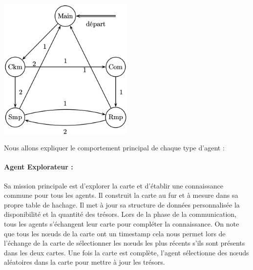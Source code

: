 \documentclass[10pt]{article}
\begin{document}
\begin{center}
	\includegraphics[width=0.5\textwidth]{automate.png}
\end{center}

Nous allons expliquer le comportement principal de chaque type d'agent :
\paragraph{Agent Explorateur :}
Sa mission principale est d'explorer la carte et d'établir une connaissance commune pour tous les agents. Il construit la carte au fur et à mesure dans sa propre table de hachage. Il met à jour sa structure de données personnalisée la disponibilité et la quantité des trésors. Lors de la phase de la communication, tous les agents s'échangent leur carte pour compléter la connaissance. On note que tous les n\oe{}uds de la carte ont un timestamp cela nous permet lors de l'échange de la carte de sélectionner les n\oe{}uds les plus récents s'ils sont présents dans les deux cartes. Une fois la carte est complète, l'agent sélectionne des n\oe{}uds aléatoires dans la carte pour mettre à jour les trésors.
\end{document}
